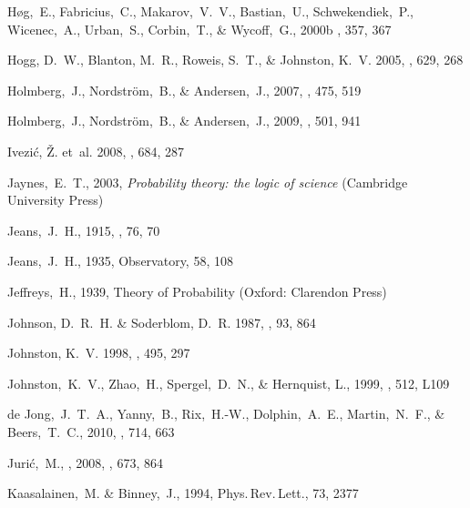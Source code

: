 \begin{thebibliography}{99}
  H{\o}g,~E., Fabricius,~C., Makarov,~V.~V., Bastian,~U., Schwekendiek,~P., Wicenec,~A., Urban,~S., Corbin,~T., \& Wycoff,~G., 2000b
    \aap, 357, 367

{Hogg}, D.~W., {Blanton}, M.~R., {Roweis}, S.~T., \& {Johnston}, K.~V. 2005,
  \apj, 629, 268

  Holmberg,~J., Nordstr\"{o}m,~B., \& Andersen,~J., 2007,
  \aap, 475, 519

  Holmberg,~J., Nordstr\"{o}m,~B., \& Andersen,~J., 2009,
  \aap, 501, 941

{Ivezi{\'c}}, {\v Z}. {et~al.} 2008, \apj, 684, 287

  Jaynes,~E.~T., 2003,
  \textit{Probability theory: the logic of science} (Cambridge University Press)

  Jeans,~J.~H., 1915,
  \mnras, 76, 70

  Jeans,~J.~H., 1935,
  Observatory, 58, 108

  Jeffreys,~H., 1939,
  Theory of Probability (Oxford: Clarendon Press)

{Johnson}, D.~R.~H. \& {Soderblom}, D.~R. 1987, \aj, 93, 864

{Johnston}, K.~V. 1998, \apj, 495, 297

  Johnston,~K.~V., Zhao,~H., Spergel,~D.~N., \& Hernquist, L., 1999,
  \apjl, 512, L109 

  de Jong,~J.~T.~A., Yanny,~B., Rix,~H.-W., Dolphin,~A.~E., Martin,~N.~F., \& Beers,~T.~C., 2010, \apj, 714, 663

  Juri\'{c},~M., \etal, 2008, \apj, 673, 864

  Kaasalainen,~M. \& Binney,~J., 1994,
  Phys.\,Rev.\,Lett., 73, 2377


\end{thebibliography}
